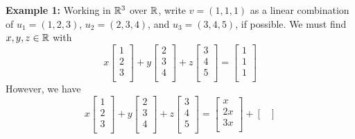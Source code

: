 \documentclass{article}
\begin{document}
\begin{examples}
  \textbf{Example 1:}\newline
  Working in $\mathbb{R}^3$ over $\mathbb{R}$, write $v = (1, 1, 1)$ as a linear combination of $u_1 = (1, 2, 3)$, $u_2 = (2, 3, 4)$, and $u_3 = (3, 4, 5)$, if possible.
  We must find $x, y, z \in \mathbb{R}$ with
  \[
    x
    \begin{bmatrix}
      1\\
      2\\
      3\\
    \end{bmatrix}
    +y
    \begin{bmatrix}
      2\\
      3\\
      4\\
    \end{bmatrix}
    +z
    \begin{bmatrix}
      3\\
      4\\
      5\\
    \end{bmatrix}
    =
    \begin{bmatrix}
      1\\
      1\\
      1\\
    \end{bmatrix}
  \]
  However, we have
  \[
    x
    \begin{bmatrix}
      1\\
      2\\
      3\\
    \end{bmatrix}
    +y
    \begin{bmatrix}
      2\\
      3\\
      4\\
    \end{bmatrix}
    +z
    \begin{bmatrix}
      3\\
      4\\
      5\\
    \end{bmatrix}
    =
    \begin{bmatrix}
      x\\
      2x\\
      3x\\
    \end{bmatrix}
    +
    \begin{bmatrix}

\end{bmatrix}\]
\end{examples}
\end{document}
